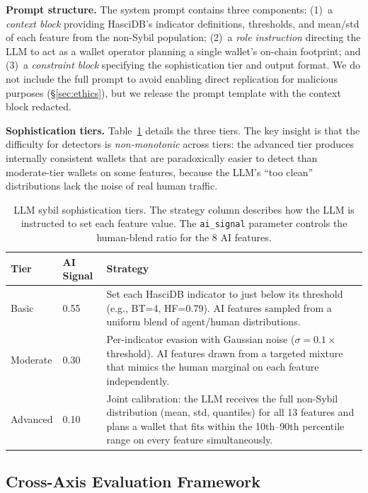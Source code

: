 \documentclass[sigconf,nonacm=false]{acmart}
\begin{document}
\noindent\textbf{Prompt structure.}
The system prompt contains three components: (1)~a \textit{context block} providing HasciDB's indicator definitions, thresholds, and mean/std of each feature from the non-Sybil population; (2)~a \textit{role instruction} directing the LLM to act as a wallet operator planning a single wallet's on-chain footprint; and (3)~a \textit{constraint block} specifying the sophistication tier and output format.
We do not include the full prompt to avoid enabling direct replication for malicious purposes (\S\ref{sec:ethics}), but we release the prompt template with the context block redacted.

\noindent\textbf{Sophistication tiers.}
Table~\ref{tab:tiers} details the three tiers. The key insight is that the difficulty for detectors is \textit{non-monotonic} across tiers: the advanced tier produces internally consistent wallets that are paradoxically easier to detect than moderate-tier wallets on some features, because the LLM's ``too clean'' distributions lack the noise of real human traffic.

\begin{table}[t]
\caption{LLM sybil sophistication tiers. The strategy column describes how the LLM is instructed to set each feature value. The \texttt{ai\_signal} parameter controls the human-blend ratio for the 8 AI features.}
\label{tab:tiers}
\small
\begin{tabular}{p{1.1cm}p{1.5cm}p{4.2cm}}
\toprule
Tier & AI Signal & Strategy \\
\midrule
Basic & 0.55 & Set each HasciDB indicator to just below its threshold (e.g., BT=4, HF=0.79). AI features sampled from a uniform blend of agent/human distributions. \\
\addlinespace
Moderate & 0.30 & Per-indicator evasion with Gaussian noise ($\sigma = 0.1 \times$ threshold). AI features drawn from a targeted mixture that mimics the human marginal on each feature independently. \\
\addlinespace
Advanced & 0.10 & Joint calibration: the LLM receives the full non-Sybil distribution (mean, std, quantiles) for all 13 features and plans a wallet that fits within the 10th--90th percentile range on every feature simultaneously. \\
\bottomrule
\end{tabular}
\end{table}

\subsection{Cross-Axis Evaluation Framework}
\label{sec:methods:crossaxis}
\end{document}
